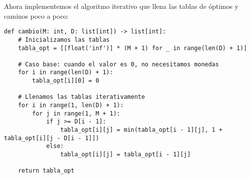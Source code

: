 






Ahora implementemos el algoritmo iterativo que llena las tablas de óptimos y caminos poco a poco:

\begin{lstlisting}
def cambio(M: int, D: list[int]) -> list[int]:
    # Inicializamos las tablas
    tabla_opt = [[float('inf')] * (M + 1) for _ in range(len(D) + 1)]

    # Caso base: cuando el valor es 0, no necesitamos monedas
    for i in range(len(D) + 1):
        tabla_opt[i][0] = 0

    # Llenamos las tablas iterativamente
    for i in range(1, len(D) + 1):
        for j in range(1, M + 1):
            if j >= D[i - 1]:
                tabla_opt[i][j] = min(tabla_opt[i - 1][j], 1 + tabla_opt[i][j - D[i - 1]])
            else:
                tabla_opt[i][j] = tabla_opt[i - 1][j]

    return tabla_opt
\end{lstlisting}

